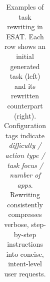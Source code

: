 \begin{table}[t]
\begin{tabular}{p{0.46\linewidth} p{0.46\linewidth}}
\bottomrule
\end{tabular}
\caption{Examples of task rewriting in \textsc{ESAT}. Each row shows an initial generated task (left) and its rewritten counterpart (right). Configuration tags indicate \emph{difficulty / action type / task focus / number of apps}. Rewriting consistently compresses verbose, step-by-step instructions into concise, intent-level user requests.}
\label{tab:rewrite_examples}
\end{table}